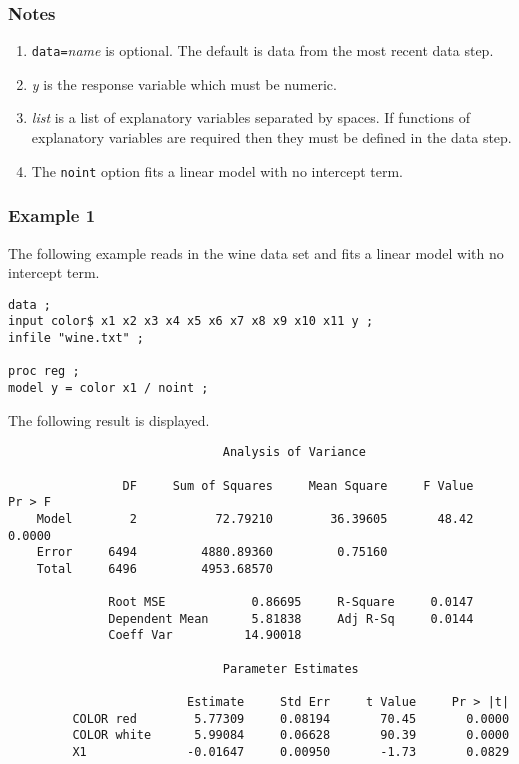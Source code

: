 \documentclass[12pt]{article}
\begin{document}
\subsubsection*{Notes}

\begin{enumerate}
\item
{\tt data=}{\it name} is optional.
The default is data from the most recent data step.
\item
{\it y} is the response variable which must be numeric.
\item
{\it list} is a list of explanatory variables separated by spaces.
If functions of explanatory variables are required then
they must be defined in the data step.
\item
The {\tt noint} option fits a linear model with no intercept term.
\end{enumerate}

\subsubsection*{Example 1}

The following example reads in the wine data set and fits
a linear model with no intercept term.

{\footnotesize\begin{verbatim}
data ;
input color$ x1 x2 x3 x4 x5 x6 x7 x8 x9 x10 x11 y ;
infile "wine.txt" ;

proc reg ;
model y = color x1 / noint ;
\end{verbatim}}

The following result is displayed.

{\footnotesize\begin{verbatim}
                              Analysis of Variance

                DF     Sum of Squares     Mean Square     F Value     Pr > F
    Model        2           72.79210        36.39605       48.42     0.0000
    Error     6494         4880.89360         0.75160                       
    Total     6496         4953.68570                                       

              Root MSE            0.86695     R-Square     0.0147
              Dependent Mean      5.81838     Adj R-Sq     0.0144
              Coeff Var          14.90018                        

                              Parameter Estimates

                         Estimate     Std Err     t Value     Pr > |t|
         COLOR red        5.77309     0.08194       70.45       0.0000
         COLOR white      5.99084     0.06628       90.39       0.0000
         X1              -0.01647     0.00950       -1.73       0.0829
\end{verbatim}}
\end{document}
